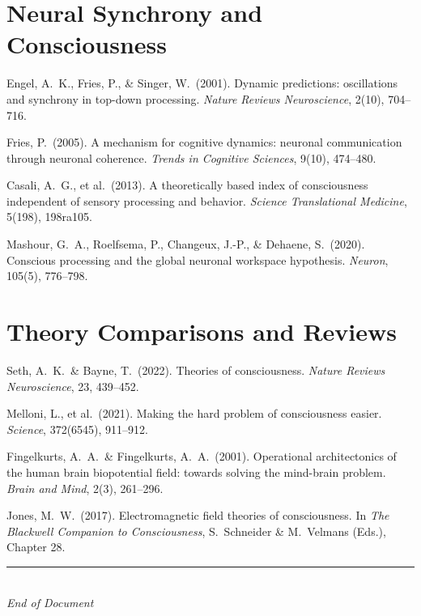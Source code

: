 \documentclass[11pt,a4paper]{report}
\begin{document}
\section*{Neural Synchrony and Consciousness}
\begin{enumerate}[label={[\arabic*]}, leftmargin=2.5em, start=16]
  \item Engel, A.\ K., Fries, P., \& Singer, W.\ (2001). Dynamic predictions: oscillations and synchrony in top-down processing. \textit{Nature Reviews Neuroscience}, 2(10), 704--716.
  \item Fries, P.\ (2005). A mechanism for cognitive dynamics: neuronal communication through neuronal coherence. \textit{Trends in Cognitive Sciences}, 9(10), 474--480.
  \item Casali, A.\ G., et al.\ (2013). A theoretically based index of consciousness independent of sensory processing and behavior. \textit{Science Translational Medicine}, 5(198), 198ra105.
  \item Mashour, G.\ A., Roelfsema, P., Changeux, J.-P., \& Dehaene, S.\ (2020). Conscious processing and the global neuronal workspace hypothesis. \textit{Neuron}, 105(5), 776--798.
\end{enumerate}

\section*{Theory Comparisons and Reviews}
\begin{enumerate}[label={[\arabic*]}, leftmargin=2.5em, start=20]
  \item Seth, A.\ K.\ \& Bayne, T.\ (2022). Theories of consciousness. \textit{Nature Reviews Neuroscience}, 23, 439--452.
  \item Melloni, L., et al.\ (2021). Making the hard problem of consciousness easier. \textit{Science}, 372(6545), 911--912.
  \item Fingelkurts, A.\ A.\ \& Fingelkurts, A.\ A.\ (2001). Operational architectonics of the human brain biopotential field: towards solving the mind-brain problem. \textit{Brain and Mind}, 2(3), 261--296.
  \item Jones, M.\ W.\ (2017). Electromagnetic field theories of consciousness. In \textit{The Blackwell Companion to Consciousness}, S.\ Schneider \& M.\ Velmans (Eds.), Chapter 28.
\end{enumerate}

\vfill
\begin{center}
  {\color{gray}\rule{0.4\textwidth}{0.5pt}}\\[8pt]
  {\small\color{gray}\itshape End of Document}
\end{center}
\end{document}
